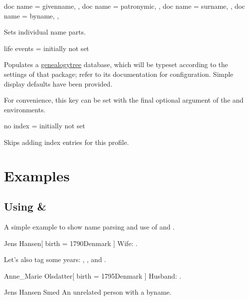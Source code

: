 \documentclass[
	a4paper,
]{article}
\begin{document}
\begin{docKeys}
	[
		doc parameter = {=\meta{...}},
		doc description = {initially not set},
	]
	{
		{
			doc name = givenname,
		},
		{
			doc name = patronymic,
		},
		{
			doc name = surname,
		},
		{
			doc name = byname,
		},
	}

	Sets individual name parts.

\end{docKeys}

\begin{docKey}
	{life events}
	{=}
	{initially not set}

	Populates a \href{https://ctan.org/pkg/genealogytree}{genealogytree} database, which will be typeset according to the settings of that package; refer to its documentation for configuration. Simple display defaults have been provided.

	For convenience, this key can be set with the final optional argument of the  and  environments.
\end{docKey}

\begin{docKey}
	{no index}
	{=}
	{initially not set}

	Skips adding index entries for this profile.
\end{docKey}

\clearpage
\section{Examples} %

\label{sec:examples}

\subsection{Using  \& }

A simple example to show name parsing and use of  and .
\begin{dispExample}

\begin{gprProfile}{Jens Hansen}[ birth = {1790}{Denmark} ]
	Wife: .

	Let's also tag some years:
	, , and .
\end{gprProfile}

\begin{gprProfile}{Anne_Marie Olsdatter}[ birth = {1795}{Denmark} ]
	Husband: .
\end{gprProfile}

\begin{gprProfile}{Jens Hansen Smed}
	An unrelated person with a byname.
\end{gprProfile}

\end{dispExample}
\end{document}
